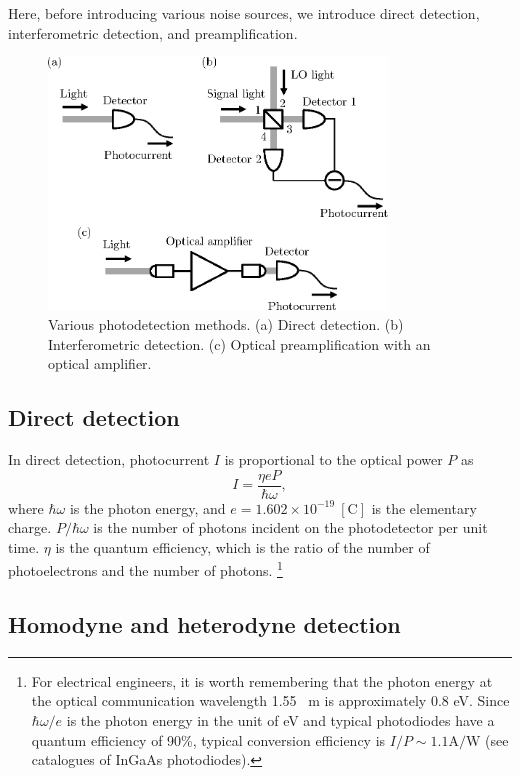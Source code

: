 \documentclass{book}
\begin{document}
Here, before introducing various noise sources, we introduce direct detection, interferometric detection, and preamplification.

\begin{figure}
  \centering
  \includegraphics[width=9cm]{fig/2-1_photodetection.eps}
  \caption{Various photodetection methods. (a) Direct detection. (b) Interferometric detection. (c) Optical preamplification with an optical amplifier.}
  \label{fig:photodetection}
\end{figure}


\subsection{Direct detection}
In direct detection, photocurrent $I$ is proportional to the optical power $P$ as 
\begin{equation}
	I = \frac{\eta e P}{\hbar \omega},
	\nonumber
\end{equation}
where $\hbar \omega$ is the photon energy, and $e = 1.602 \times 10^{-19} \ \mathrm{[C]}$ is the elementary charge. $P / \hbar \omega$ is the number of photons incident on the photodetector per unit time. $\eta$ is the quantum efficiency, which is the ratio of the number of photoelectrons and the number of photons.
\footnote{For electrical engineers, it is worth remembering that the photon energy at the optical communication wavelength 1.55 \ \textmu m is approximately 0.8 eV. Since $\hbar \omega / e$ is the photon energy in the unit of eV and typical photodiodes have a quantum efficiency of 90\%, typical conversion efficiency is $I/P \sim 1.1 \mathrm{A/W}$ (see catalogues of InGaAs photodiodes).}

\subsection{Homodyne and heterodyne detection}
\end{document}

